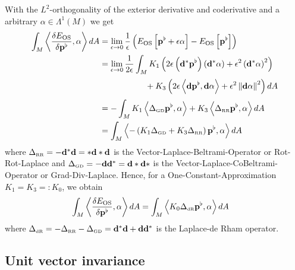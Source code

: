 \documentclass{scrartcl}
\newcommand{\exd}{\mathbf{d}}
\newcommand{\excod}{\exd^{*}} %
\newcommand{\M}{M}
\newcommand{\dA}{dA}
\newcommand{\pfl}{\mathbf{p}^{\flat}}
\newcommand{\EOS}{E_{\text{OS}}}
\newcommand{\LB}{\Delta_{\text{\tiny RR}}}
\newcommand{\LCB}{\Delta_{\text{\tiny GD}}}
\newcommand{\LDR}{\Delta_{\text{\tiny dR}}}
\begin{document}
  With the  \( L^{2} \)-orthogonality of the exterior derivative and coderivative and a arbitrary \( \alpha\in\Lambda^{1}(M) \) we get
  \begin{align}
    \int_{\M} \left\langle\frac{\delta\EOS}{\delta\pfl} , \alpha \right\rangle \dA
      &= \lim_{\epsilon\rightarrow 0} \frac{1}{\epsilon}\left( \EOS\left[ \pfl + \epsilon\alpha \right] - \EOS\left[ \pfl\right]\right) \\
      &=  \lim_{\epsilon\rightarrow 0} \frac{1}{2\epsilon} \int_{\M} 
                K_{1}\left( 2\epsilon \left( \excod\pfl \right)\left( \excod\alpha \right) 
                            + \epsilon^{2}\left( \excod\alpha \right)^{2} \right) \\
      &\phantom{= \lim_{\epsilon\rightarrow 0} \frac{1}{2\epsilon} \int_{\M}}
                +K_{3}\left(2\epsilon\left\langle \exd\pfl, \exd\alpha \right\rangle
                            + \epsilon^{2}\left\| \exd\alpha \right\|^{2}\right)\dA \\
      &= -\int_{\M} K_{1} \left\langle \LCB\pfl, \alpha \right\rangle + K_{3} \left\langle \LB\pfl, \alpha \right\rangle \dA \\
      &= \int_{\M} \left\langle -\left( K_{1}\LCB + K_{3}\LB\right)\pfl , \alpha \right\rangle \dA
  \end{align}
  where \( \LB = -\excod\exd = *\exd *\exd  \) is the Vector-Laplace-Beltrami-Operator or Rot-Rot-Laplace 
  and \( \LCB = - \exd\excod = \exd * \exd * \) is the Vector-Laplace-CoBeltrami-Operator or Grad-Div-Laplace.
  Hence, for a One-Constant-Approximation \( K_{1} = K_{3} =: K_{0} \), we obtain
  \begin{align}
    \int_{\M} \left\langle\frac{\delta\EOS}{\delta\pfl} , \alpha \right\rangle \dA
     &= \int_{\M} \left\langle K_{0}\LDR\pfl , \alpha \right\rangle \dA
  \end{align}
  where \( \LDR = -\LB - \LCB = \excod\exd + \exd\excod\) is the Laplace-de Rham operator.
  
  \subsection{Unit vector invariance}
  
\end{document}
